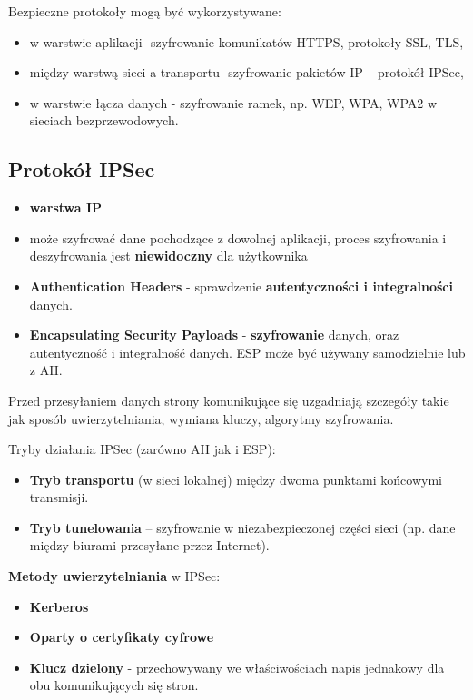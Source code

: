 \documentclass[../main.tex]{subfiles}
\begin{document}
    Bezpieczne protokoły mogą być wykorzystywane:
    \begin{itemize}
        \item w warstwie aplikacji- szyfrowanie komunikatów HTTPS, protokoły SSL, TLS,
        \item między warstwą sieci a transportu- szyfrowanie pakietów IP – protokół IPSec,
        \item w warstwie łącza danych - szyfrowanie ramek, np. WEP, WPA, WPA2 w sieciach bezprzewodowych.
    \end{itemize}


    \subsection{Protokół IPSec}
    \begin{itemize}
        \item \textbf{warstwa IP}
        \item może szyfrować dane pochodzące z dowolnej
        aplikacji, proces szyfrowania i deszyfrowania jest \textbf{niewidoczny} dla użytkownika
        \item \textbf{Authentication Headers} - sprawdzenie \textbf{autentyczności i integralności} danych.
        \item \textbf{Encapsulating Security Payloads} - \textbf{szyfrowanie} danych, oraz autentyczność i integralność danych. ESP może być
        używany samodzielnie lub z AH.
    \end{itemize}

    Przed przesyłaniem danych strony komunikujące się uzgadniają szczegóły takie jak sposób
    uwierzytelniania, wymiana kluczy, algorytmy szyfrowania.

    Tryby działania IPSec (zarówno AH jak i ESP):
    \begin{itemize}
        \item \textbf{Tryb transportu} (w sieci lokalnej) między dwoma punktami końcowymi transmisji.
        \item \textbf{Tryb tunelowania} – szyfrowanie w niezabezpieczonej części sieci (np. dane między
        biurami przesyłane przez Internet).
    \end{itemize}

    \textbf{Metody uwierzytelniania} w IPSec:
    \begin{itemize}
        \item \textbf{Kerberos}
        \item \textbf{Oparty o certyfikaty cyfrowe}
        \item \textbf{Klucz dzielony} - przechowywany we właściwościach napis jednakowy dla obu
        komunikujących się stron.
    \end{itemize}
\end{document}
